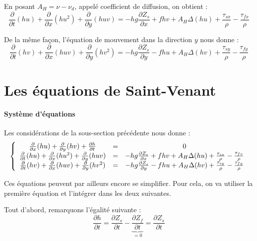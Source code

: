 En posant $A_H=\nu-\nu_d$, appelé coefficient de diffusion, on obtient :
\begin{equation} \label{II-2-10}
	\frac{\partial}{\partial t}(hu) + \frac{\partial}{\partial x} (hu^2) + \frac{\partial}{\partial y}(huv) = -hg\frac{\partial Z_s}{\partial x} + fhv + A_H\Delta(hu) + \frac{\tau_{sx}}{\rho} - \frac{\tau_{fx}}{\rho}
\end{equation}

De la même façon, l'équation de mouvement dans la direction $y$ nous donne :
\begin{equation} \label{II-2-11}
	\frac{\partial}{\partial t}(hv) + \frac{\partial}{\partial x} (huv) + \frac{\partial}{\partial y}(hv^2) = -hg\frac{\partial Z_s}{\partial y} - fhu + A_H\Delta(hv) + \frac{\tau_{sy}}{\rho} - \frac{\tau_{fy}}{\rho}
\end{equation}

\section{Les équations de Saint-Venant}
\paragraph{Système d'équations}
Les considérations de la sous-section précédente nous donne :
\[\left\{ \begin{array}{c c c}
	\frac{\partial}{\partial x} (hu) + \frac{\partial}{\partial y} (hv) + \frac{\partial h}{\partial t} &=& 0 \\
      \frac{\partial}{\partial t}(hu) + \frac{\partial}{\partial x} (hu^2) + \frac{\partial}{\partial y}(huv) &=& -hg\frac{\partial Z_s}{\partial x} + fhv + A_H\Delta(hu) + \frac{\tau_{sx}}{\rho} - \frac{\tau_{fx}}{\rho}\\
	     \frac{\partial}{\partial t}(hv) + \frac{\partial}{\partial x} (huv) + \frac{\partial}{\partial y}(hv^2) &=& -hg\frac{\partial Z_s}{\partial y} - fhu + A_H\Delta(hv) + \frac{\tau_{sy}}{\rho} - \frac{\tau_{fy}}{\rho}
\end{array}\right.\]

Ces équations peuvent par ailleurs encore se simplifier. Pour cela, on va utiliser la première équation et l'intégrer dans les deux suivantes.

\bigskip
Tout d'abord, remarquons l'égalité suivante :
\begin{equation} \label{II-2-4-1}
	\frac{\partial h}{\partial t} = \frac{\partial Z_s}{\partial t} - \underbrace{\frac{\partial Z_f}{\partial t}}_{=0} = \frac{\partial Z_s}{\partial t}
\end{equation}

